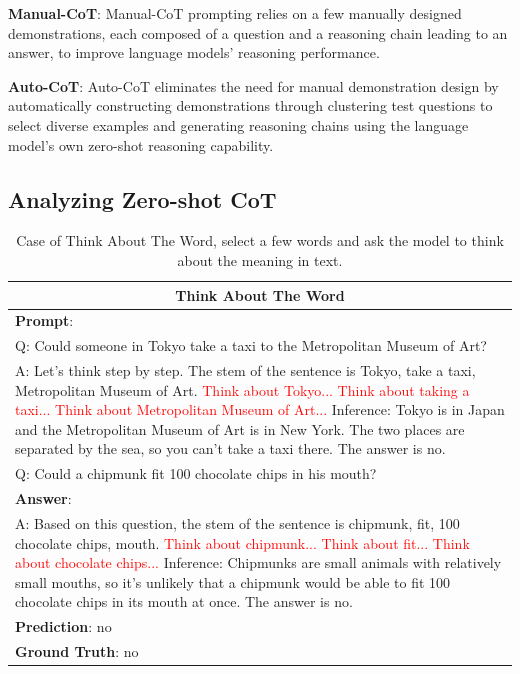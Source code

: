 \documentclass[11pt]{article}
\begin{document}
\noindent
\textbf{Manual-CoT}: Manual-CoT prompting relies on a few manually designed demonstrations, each composed of a question and a reasoning chain leading to an answer, to improve language models' reasoning performance.

\noindent
\textbf{Auto-CoT}: Auto-CoT eliminates the need for manual demonstration design by automatically constructing demonstrations through clustering test questions to select diverse examples and generating reasoning chains using the language model's own zero-shot reasoning capability.

\subsection{Analyzing Zero-shot CoT}
\begin{table}[t]
\small
  \caption{Case of Think About The Word, select a few words and ask the model to think about the meaning in text.}
  \label{Think}
  \begin{tabularx}{\textwidth}{X}
    \toprule
    \multicolumn{1}{c}{\textbf{Think About The Word}} \\
    \midrule
    \textbf{Prompt}: \\
    Q: Could someone in Tokyo take a taxi to the Metropolitan Museum of Art?\\
    A: Let's think step by step. The stem of the sentence is Tokyo, take a taxi, Metropolitan Museum of Art. \textcolor{red}{Think about Tokyo... Think about taking a taxi... Think about Metropolitan Museum of Art...} Inference: Tokyo is in Japan and the Metropolitan Museum of Art is in New York. The two places are separated by the sea, so you can't take a taxi there. The answer is no. \\
    \midrule
    Q: Could a chipmunk fit 100 chocolate chips in his mouth?\\
    \textbf{Answer}:\\
    A: Based on this question, the stem of the sentence is chipmunk, fit, 100 chocolate chips, mouth. \textcolor{red}{Think about chipmunk... Think about fit... Think about chocolate chips...} Inference: Chipmunks are small animals with relatively small mouths, so it's unlikely that a chipmunk would be able to fit 100 chocolate chips in its mouth at once. The answer is no.\\
    \textbf{Prediction}: no\\
    \textbf{Ground Truth}: no\\
    \bottomrule
  \end{tabularx}
\end{table}
\end{document}
